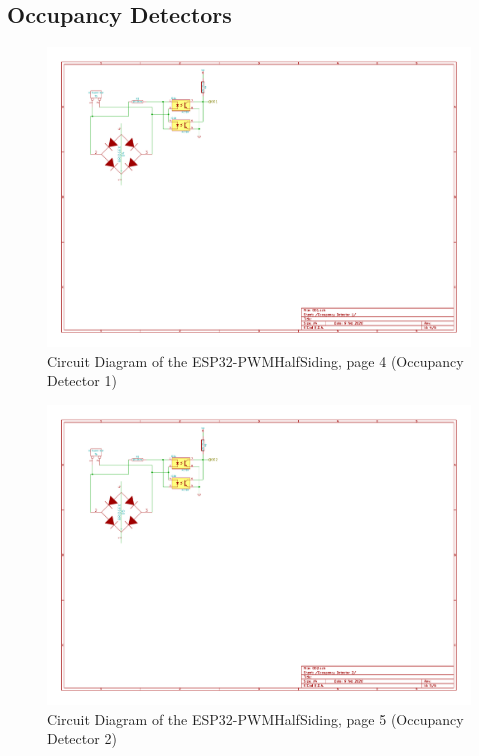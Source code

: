 \subsection{Occupancy Detectors}
\begin{figure}[hbpt]\begin{centering}%
\includegraphics[width=5in]{ESP32-PWMHalfSiding-4.pdf}
\caption{Circuit Diagram of the ESP32-PWMHalfSiding, page 4 (Occupancy 
Detector 1)}
\end{centering}\end{figure}
\begin{figure}[hbpt]\begin{centering}%
\includegraphics[width=5in]{ESP32-PWMHalfSiding-5.pdf}
\caption{Circuit Diagram of the ESP32-PWMHalfSiding, page 5 (Occupancy 
Detector 2)}
\end{centering}\end{figure}


